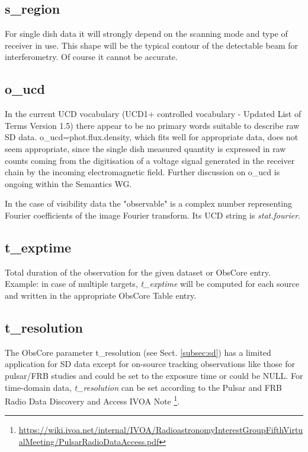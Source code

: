 \documentclass[11pt,a4paper]{ivoa}
\begin{document}
 
\subsection{s\_region}
For single dish data it will strongly depend on the scanning mode and type of receiver in use.
This shape will be the typical contour of the detectable beam for interferometry. Of course it cannot be accurate. 

\subsection{o\_ucd}

In the current UCD vocabulary (UCD1+ controlled vocabulary - Updated List of Terms Version 1.5) there appear to be no primary words suitable to describe raw SD data. o\_ucd=phot.flux.density, which fits well for appropriate data, does not seem appropriate, since the single dish measured quantity is expressed in raw counts coming from the digitisation of a voltage signal generated in the receiver chain by the incoming electromagnetic field. Further discussion on o\_ucd is ongoing within the Semantics WG.

In the case of visibility data the "observable" is a complex number representing Fourier 
coefficients of the image Fourier transform. Its UCD string is \emph{stat.fourier}. 

\subsection{t\_exptime}
Total duration of the observation for the given dataset or ObsCore entry. Example: in case of multiple targets, \emph{t\_exptime} will be computed for each source and written in the appropriate ObsCore Table entry. 


\subsection{t\_resolution}
The ObsCore parameter t\_resolution (see Sect. \ref{subsec:sd}) has a limited application for SD data
except for on-source tracking observations like those for pulsar/FRB studies and could be set to the
exposure time or could be NULL. For time-domain data, \emph{t\_resolution} can be set according to the Pulsar
and FRB Radio Data Discovery and Access IVOA Note \footnote{\url{https://wiki.ivoa.net/internal/IVOA/RadioastronomyInterestGroupFifthVirtualMeeting/PulsarRadioDataAccess.pdf}}.
\end{document}
